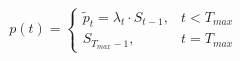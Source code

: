 \documentclass[preview]{standalone}
\begin{document}
\begin{align*}
p(t) = \begin{cases} \tilde{p}_t = \lambda_t \cdot S_{t-1}, & t < T_{max} \\S_{T_{max}-1}, & t = T_{max}\end{cases}
\end{align*}
\end{document}
